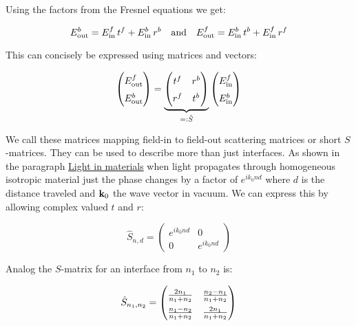 Using the factors from the Fresnel equations we get:

\begin{equation}
    E^b_\s{out} = E^f_\s{in} \, t^f + E^b_\s{in} \, r^b
    \qq{and}
    E^f_\s{out} = E^b_\s{in} \, t^b + E^f_\s{in} \, r^f
\end{equation}

This can concisely be expressed using matrices and vectors:

\begin{equation}
\begin{pmatrix}
    E^f_\s{out} \\
    E^b_\s{out}
\end{pmatrix} =
\underbrace{
\begin{pmatrix}
    t^f & r^b \\
    r^f & t^b
\end{pmatrix}
}_{
 =: \hat{S}
}
\begin{pmatrix}
    E^f_\s{in} \\
    E^b_\s{in}
\end{pmatrix}
\end{equation}

We call these matrices mapping field-in to field-out scattering matrices or short $S$-matrices. They can be used to describe more than just interfaces. As shown in the paragraph \hyperref[par:light_in_materials]{Light in materials} when light propagates through homogeneous isotropic material just the phase changes by a factor of $e^{i k_0 n d}$ where $d$ is the distance traveled and $\vb k_0$ the wave vector in vacuum. We can express this by allowing complex valued $t$ and $r$:

\begin{equation}
    \hat S_{n, d} =
    \begin{pmatrix}
        e^{i k_0 n d} & 0 \\
        0 & e^{i k_0 n d}
    \end{pmatrix}
\end{equation}

Analog the $S$-matrix for an interface from $n_1$ to $n_2$ is:

\begin{equation}
    \hat S_{n_1, n_2} =
    \begingroup
    \renewcommand*{\arraystretch}{1.5}
        \begin{pmatrix}
            \frac{2 n_1}{n_1 + n_2} & \frac{n_2 - n_1}{n_1 + n_2} \\
            \frac{n_1 - n_2}{n_1 + n_2} & \frac{2 n_1}{n_1 + n_2}
        \end{pmatrix}
    \endgroup
\end{equation}
\\


